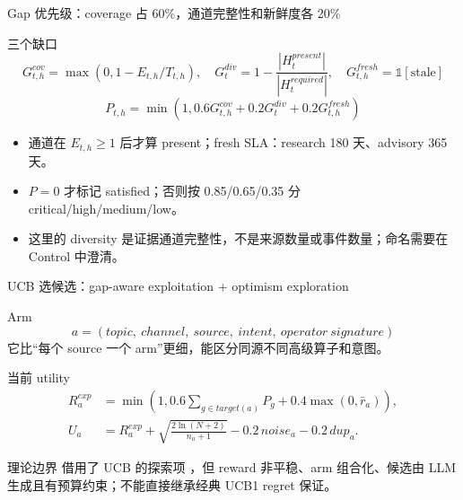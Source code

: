 \begin{frame}{Gap 优先级：coverage 占 60\%，通道完整性和新鲜度各 20\%}
\begin{block}{三个缺口}
\[
G^{cov}_{t,h}=\max(0,1-E_{t,h}/T_{t,h}),\quad
G^{div}_{t}=1-\frac{|H^{present}_t|}{|H^{required}_t|},\quad
G^{fresh}_{t,h}=\mathbb{1}[\text{stale}]
\]
\[
P_{t,h}=\min\left(1,0.6G^{cov}_{t,h}+0.2G^{div}_{t}+0.2G^{fresh}_{t,h}\right)
\]
\end{block}

\begin{itemize}
  \item 通道在 $E_{t,h}\ge 1$ 后才算 present；fresh SLA：research 180 天、advisory 365 天。
  \item $P=0$ 才标记 satisfied；否则按 0.85/0.65/0.35 分 critical/high/medium/low。
  \item 这里的 diversity 是\alert{证据通道完整性}，不是来源数量或事件数量；命名需要在 Control 中澄清。
\end{itemize}
\end{frame}

\begin{frame}{UCB 选候选：gap-aware exploitation + optimism exploration}
\scriptsize
\begin{block}{Arm}
\[
a=(topic,\ channel,\ source,\ intent,\ operator\ signature)
\]
它比“每个 source 一个 arm”更细，能区分同源不同高级算子和意图。
\end{block}
\begin{block}{当前 utility}
\[
\begin{aligned}
R_a^{exp}&=\min\left(1,0.6\sum_{g\in target(a)}P_g+0.4\max(0,\bar r_a)\right),\\
U_a&=R_a^{exp}+\sqrt{\frac{2\ln(N+2)}{n_a+1}}-0.2\,noise_a-0.2\,dup_a.
\end{aligned}
\]
\end{block}

\begin{alertblock}{理论边界}
借用了 UCB 的探索项 \cite{auer2002ucb}，但 reward 非平稳、arm 组合化、候选由 LLM 生成且有预算约束；不能直接继承经典 UCB1 regret 保证。
\end{alertblock}
\end{frame}

